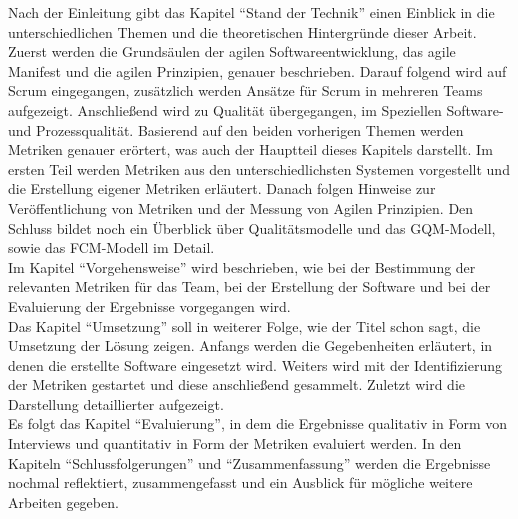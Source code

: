 Nach der Einleitung gibt das Kapitel ``Stand der Technik'' einen Einblick in die unterschiedlichen Themen und die theoretischen Hintergründe dieser Arbeit.
Zuerst werden die Grundsäulen der agilen Softwareentwicklung, das agile Manifest und die agilen Prinzipien, genauer beschrieben.
Darauf folgend wird auf Scrum eingegangen, zusätzlich werden Ansätze für Scrum in mehreren Teams aufgezeigt.
Anschließend wird zu Qualität übergegangen, im Speziellen Software- und Prozessqualität.
Basierend auf den beiden vorherigen Themen werden Metriken genauer erörtert, was auch der Hauptteil dieses Kapitels darstellt.
Im ersten Teil werden Metriken aus den unterschiedlichsten Systemen vorgestellt und die Erstellung eigener Metriken erläutert.
Danach folgen Hinweise zur Veröffentlichung von Metriken und der Messung von Agilen Prinzipien.
Den Schluss bildet noch ein Überblick über Qualitätsmodelle und das \ac{GQM}-Modell, sowie das \ac{FCM}-Modell im Detail.
\\
Im Kapitel ``Vorgehensweise'' wird beschrieben, wie bei der Bestimmung der relevanten Metriken für das Team, bei der Erstellung der Software und bei der Evaluierung der Ergebnisse vorgegangen wird.
\\
Das Kapitel ``Umsetzung'' soll in weiterer Folge, wie der Titel schon sagt, die Umsetzung der Lösung zeigen.
Anfangs werden die Gegebenheiten erläutert, in denen die erstellte Software eingesetzt wird.
Weiters wird mit der Identifizierung der Metriken gestartet und diese anschließend gesammelt.
Zuletzt wird die Darstellung detaillierter aufgezeigt.
\\
Es folgt das Kapitel ``Evaluierung'', in dem die Ergebnisse qualitativ in Form von Interviews und quantitativ in Form der Metriken evaluiert werden.
In den Kapiteln ``Schlussfolgerungen'' und ``Zusammenfassung'' werden die Ergebnisse nochmal reflektiert, zusammengefasst und ein Ausblick für mögliche weitere Arbeiten gegeben.
